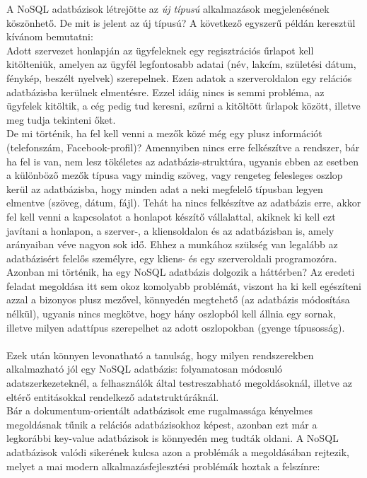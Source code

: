 A NoSQL adatbázisok létrejötte az \emph{új típusú} alkalmazások megjelenésének köszönhető. De mit is jelent az új típusú? A következő egyszerű példán keresztül kívánom bemutatni:\\
Adott szervezet honlapján az ügyfeleknek egy regisztrációs űrlapot kell kitölteniük, amelyen az ügyfél legfontosabb adatai (név, lakcím, születési dátum, fénykép, beszélt nyelvek) szerepelnek. Ezen adatok a szerveroldalon egy relációs adatbázisba kerülnek elmentésre. Ezzel idáig nincs is semmi probléma, az ügyfelek kitöltik, a cég pedig tud keresni, szűrni a kitöltött űrlapok között, illetve meg tudja tekinteni őket.\\
De mi történik, ha fel kell venni a mezők közé még egy plusz információt (telefonszám, Facebook-profil)? Amennyiben nincs erre felkészítve a rendszer, bár ha fel is van, nem lesz tökéletes az adatbázis-struktúra, ugyanis ebben az esetben a különböző mezők típusa vagy mindig szöveg, vagy rengeteg felesleges oszlop kerül az adatbázisba, hogy minden adat a neki megfelelő típusban legyen elmentve (szöveg, dátum, fájl). Tehát ha nincs felkészítve az adatbázis erre, akkor fel kell venni a kapcsolatot a honlapot készítő vállalattal, akiknek ki kell ezt javítani a honlapon, a szerver-, a kliensoldalon és az adatbázisban is, amely arányaiban véve nagyon sok idő. Ehhez a munkához szükség van legalább az adatbázisért felelős személyre, egy kliens- és egy szerveroldali programozóra. \\
Azonban mi történik, ha egy NoSQL adatbázis dolgozik a háttérben? Az eredeti feladat megoldása itt sem okoz komolyabb problémát, viszont ha ki kell egészíteni azzal a bizonyos plusz mezővel, könnyedén megtehető (az adatbázis módosítása nélkül), ugyanis nincs megkötve, hogy hány oszlopból kell állnia egy sornak, illetve milyen adattípus szerepelhet az adott oszlopokban (gyenge típusosság).\\
\\
Ezek után könnyen levonatható a tanulság, hogy milyen rendszerekben alkalmazható jól egy NoSQL adatbázis: folyamatosan módosuló adatszerkezeteknél, a felhasználók által testreszabható megoldásoknál, illetve az eltérő entitásokkal rendelkező adatstruktúráknál.
\\
Bár a dokumentum-orientált adatbázisok eme rugalmassága kényelmes megoldásnak tűnik a relációs adatbázisokhoz képest, azonban ezt már a legkorábbi key-value adatbázisok is könnyedén meg tudták oldani. A NoSQL adatbázisok valódi sikerének kulcsa azon a problémák a megoldásában rejtezik, melyet a mai modern alkalmazásfejlesztési problémák hoztak a felszínre:
